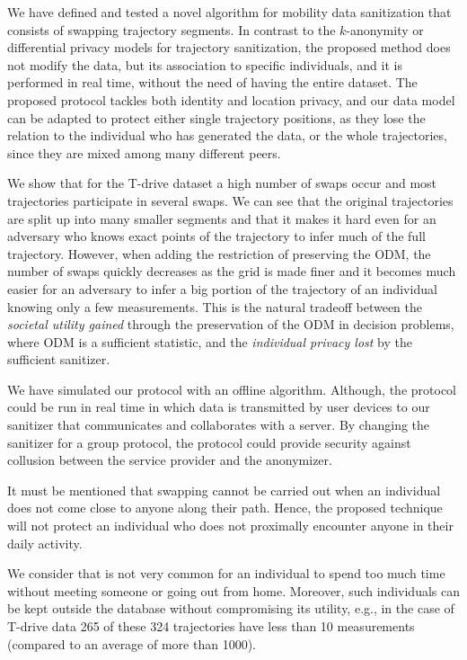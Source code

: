 \documentclass{llncs}
\begin{document}
We have defined and tested a novel algorithm for mobility data \linebreak
sanitization that consists of swapping trajectory segments. In contrast to the $k$-anonymity or differential privacy models for trajectory sanitization, the proposed method does not modify the data, but its association to specific individuals, and it is performed in real time, without the need of having the entire dataset.
The proposed protocol tackles both identity and location privacy,
and our data model can be adapted to protect either single trajectory positions, as they lose the relation to the individual who has generated the data, or the whole trajectories, since they are mixed among many different peers.

We show that for the T-drive dataset a high number of swaps occur and
most trajectories participate in several swaps. We can see that the
original trajectories are split up into many smaller segments and that
it makes it hard even for an adversary who knows exact points of the
trajectory to infer much of the full trajectory. However, when adding
the restriction of preserving the ODM, the number of swaps quickly
decreases as the grid is made finer and it becomes much easier for an
adversary to infer a big portion of the trajectory of an individual
knowing only a few measurements.  
This is the natural tradeoff between the {\em societal utility gained} through the preservation of the ODM in decision problems, where ODM is a sufficient statistic, and the {\em individual privacy lost} by the sufficient sanitizer.

We have simulated our protocol with an offline algorithm. Although, the protocol could be run in real time in which data is transmitted by user devices to our sanitizer that communicates and collaborates with a server. By changing the sanitizer for a group protocol, the protocol could provide security against collusion between the service provider and the anonymizer.


It must be mentioned that swapping cannot be carried out when an individual does not come close to anyone along their path. 
Hence, the proposed technique will not protect an individual who does not proximally encounter anyone in their daily activity.

We consider that is not very common for an individual to spend too much time without meeting someone or going out from home. Moreover, such individuals can be kept outside the database without compromising its utility, e.g., in the case of T-drive data 265 of these 324 trajectories have less than 10 measurements (compared to an average of more than 1000).
\end{document}
